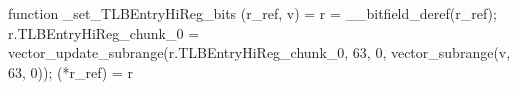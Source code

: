 function _set_TLBEntryHiReg_bits (r_ref, v) = {
    r = __bitfield_deref(r_ref);
    r.TLBEntryHiReg_chunk_0 = vector_update_subrange(r.TLBEntryHiReg_chunk_0, 63, 0, vector_subrange(v, 63, 0));
    (*r_ref) = r
}
